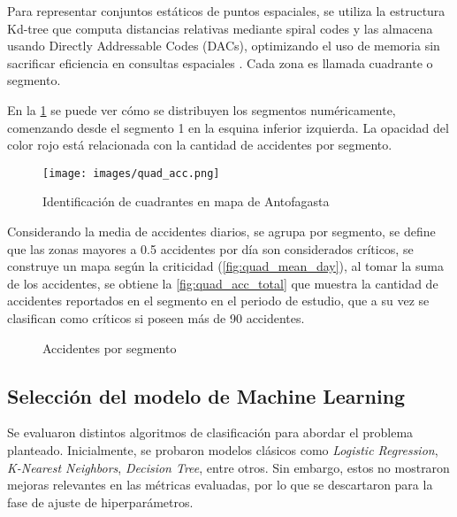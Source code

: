 \documentclass[12pt]{article}
\begin{document}
Para representar conjuntos estáticos de puntos espaciales, se utiliza la estructura Kd-tree que computa distancias relativas mediante spiral codes y las almacena usando Directly Addressable Codes (DACs), optimizando el uso de memoria sin sacrificar eficiencia en consultas espaciales \citep{gutierrez2023ckdtree}. Cada zona es llamada cuadrante o segmento.

En la \cref{fig:quad_acc} se puede ver cómo se distribuyen los segmentos numéricamente, comenzando desde el segmento 1 en la esquina inferior izquierda. La opacidad del color rojo está relacionada con la cantidad de accidentes por segmento.

\begin{figure}[H]
    \centering
    \texttt{[image: images/quad\_acc.png]}
    \caption{Identificación de cuadrantes en mapa de Antofagasta}
    \label{fig:quad_acc}
\end{figure}

Considerando la media de accidentes diarios, se agrupa por segmento, se define que las zonas mayores a 0.5 accidentes por día son considerados críticos, se construye un mapa según la criticidad (\cref{fig:quad_mean_day}), al tomar la suma de los accidentes, se obtiene la \cref{fig:quad_acc_total} que muestra la cantidad de accidentes reportados en el segmento en el periodo de estudio, que a su vez se clasifican como críticos si poseen más de 90 accidentes.


\begin{figure}[H]
    \centering
    \caption{Accidentes por segmento}
\end{figure}




\subsection{Selección del modelo de Machine Learning}

Se evaluaron distintos algoritmos de clasificación para abordar el problema planteado. Inicialmente, se probaron modelos clásicos como \textit{Logistic Regression}, \textit{K-Nearest Neighbors}, \textit{Decision Tree}, entre otros. Sin embargo, estos no mostraron mejoras relevantes en las métricas evaluadas, por lo que se descartaron para la fase de ajuste de hiperparámetros.
\end{document}
